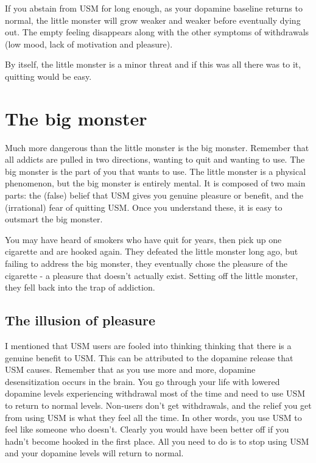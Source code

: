 \documentclass[
]{book}
\begin{document}
If you abstain from USM for long enough, as your dopamine baseline returns to normal, the little monster will grow weaker and weaker before eventually dying out. The empty feeling disappears along with the other symptoms of withdrawals (low mood, lack of motivation and pleasure).

By itself, the little monster is a minor threat and if this was all there was to it, quitting would be easy.

\section{The big monster}\label{the-big-monster}

Much more dangerous than the little monster is the big monster. Remember that all addicts are pulled in two directions, wanting to quit and wanting to use. The big monster is the part of you that wants to use. The little monster is a physical phenomenon, but the big monster is entirely mental. It is composed of two main parts: the (false) belief that USM gives you genuine pleasure or benefit, and the (irrational) fear of quitting USM. Once you understand these, it is easy to outsmart the big monster.

You may have heard of smokers who have quit for years, then pick up one cigarette and are hooked again. They defeated the little monster long ago, but failing to address the big monster, they eventually chose the pleasure of the cigarette - a pleasure that doesn't actually exist. Setting off the little monster, they fell back into the trap of addiction.

\subsection{The illusion of pleasure}\label{the-illusion-of-pleasure}

I mentioned that USM users are fooled into thinking thinking that there is a genuine benefit to USM. This can be attributed to the dopamine release that USM causes. Remember that as you use more and more, dopamine desensitization occurs in the brain. You go through your life with lowered dopamine levels experiencing withdrawal most of the time and need to use USM to return to normal levels. Non-users don't get withdrawals, and the relief you get from using USM is what they feel all the time. In other words, you use USM to feel like someone who doesn't. Clearly you would have been better off if you hadn't become hooked in the first place. All you need to do is to stop using USM and your dopamine levels will return to normal.
\end{document}
